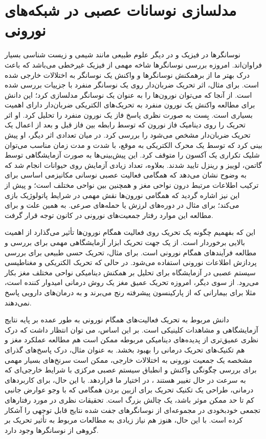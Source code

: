 \section{   مدلسازی نوسانات عصبی در شبکه‌های نورونی }

نوسانگرها در فیزیک و در دیگر علوم طبیعی  مانند شیمی و زیست شناسی بسیار فراوان‌اند.
امروزه بررسی نوسانگر‌ها شاخه مهمی از فیزیک غیرخطی می‌باشد که باعث درک بهتر ما از برهمکنش نوسانگر‌ها و واکنش یک نوسانگر به اختلالات خارجی شده است.
برای مثال، اثر تحریک ضربان‌دار
روی یک نوسانگر منفرد با جزییات بررسی شده است. 
از آنجا که می‌توان نورون‌ها را به عنوان یک نوسانگر مدلسازی کرد؛ این دانش برای مطالعه واکنش یک نورون منفرد به تحریک‌های الکتریکی ضربان‌دار دارای اهمیت بسیاری است.
بِست
به صورت نظری پاسخ فاز
یک نورون منفرد را تحلیل کرد.
\cite{best1979disrupting}
او اثر تحریک را روی دینامیک فاز نورون که توسط رابطه بین فاز قبل و بعد از اعمال یک تحریک ضربان‌دار مشخص می‌شود را بررسی کرد. در میان تعدادی اثر دیگر، او پیش بینی کرد که توسط یک محرک الکتریکی به موقع، با شدت و مدت زمان مناسب می‌توان شلیک تکراری یک آکسون را متوقف کرد. این پیش‌بینی‌ها به صورت آزمایشگاهی توسط گاتمن، لوییز و رینزل تایید شدند.
\cite{guttman1980control}
بعلاوه، تعداد زیادی آزمایش روی حیوانات انجام شد که به وضوح نشان می‌دهد که همگامی فعالیت عصبی نوسانی مکانیزمی اساسی برای ترکیب اطلاعات مرتبط درون نواحی مغز و همچنین بین نواحی مختلف است؛ و پیش از این نیز اشاره گردید که همگامی نورون‌ها نقش مهمی در شرایط پاتولوژیک بازی می‌کند؛ برای مثال در دوره‌های لرزش یا حمله‌های صرعی. به همین علت و برای مطالعه این موارد رفتار جمعیت‌های نورونی در کانون توجه قرار گرفت. 

این که بفهمیم چگونه یک تحریک روی فعالیت همگام نورون‌ها تأثیر می‌گذارد از اهمیت بالایی برخوردار است. از یک جهت تحریک ابزار آزمایشگاهی مهمی برای بررسی و مطالعه فرآیندهای همگام نورونی است. برای مثال، تحریک حسی طبیعی برای بررسی پردازش اطلاعات نورونی استفاده می‌شود. در حالی که تحریک الکتریکی و مغناطیسی سیستم عصبی در آزمایشگاه برای تحلیل بر همکنش دینامیکی نواحی مختلف مغز بکار می‌رود. از سوی دیگر، امروزه تحریک عمیق مغز یک روش درمانی امیدوار کننده است، مثلا برای بیمارانی که از پارکینسون پیشرفته رنج می‌برند و به درمان‌های دارویی پاسخ نمی‌دهند. 

دانش مربوط به تحریک فعالیت‌های همگام نورونی به طور عمده بر پایه نتایج آزمایشگاهی و مشاهدات کلینیکی است. بر این اساس، می توان انتظار داشت که درک نظری عمیق‌تری از پدیده‌‌های دینامیکی مربوطه ممکن است هم مطالعه عملکرد مغز و هم تکنیک‌های تحریک درمانی را بهبود بخشد. به عنوان مثال، درک پاسخ‌های گذرای مشخصه
یک جمعیت نورونی به اختلالات خارجی، ممکن است سرنخ‌های بسیار مهمی برای بررسی چگونگی واکنش و انطباق سیستم عصبی مرکزی با شرایط خارجی‌ای که به سرعت در حال تغییر هستند ، در اختیار ما قراردهد. با این حال، برای کاربردهای درمانی، طراحی یک تکنیک تحریک برای ازبین بردن همگامی که  با وجو عوارض جانبی کم تا حد ممکن موثر باشد، یک چالش بزرگ است. تحقیقات نظری در مورد رفتارهای تجمعی خودبخودی در مجموعه‌ای از نوسانگرهای جفت شده نتایج قابل توجهی را آشکار کرده است. با این حال، هنوز هم نیاز زیادی به مطالعات مربوط به تأثیر تحریک بر گروهی از نوسانگرها وجود دارد.

